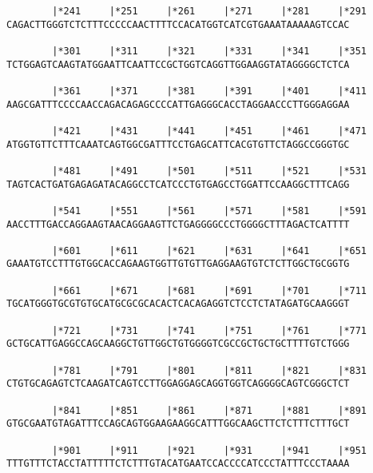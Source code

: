 \documentclass{article}
\begin{document}
\begin{Verbatim}
        |*241     |*251     |*261     |*271     |*281     |*291
CAGACTTGGGTCTCTTTCCCCCAACTTTTCCACATGGTCATCGTGAAATAAAAAGTCCAC
                                                            
        |*301     |*311     |*321     |*331     |*341     |*351
TCTGGAGTCAAGTATGGAATTCAATTCCGCTGGTCAGGTTGGAAGGTATAGGGGCTCTCA
                                                            
        |*361     |*371     |*381     |*391     |*401     |*411
AAGCGATTTCCCCAACCAGACAGAGCCCCATTGAGGGCACCTAGGAACCCTTGGGAGGAA
                                                            
        |*421     |*431     |*441     |*451     |*461     |*471
ATGGTGTTCTTTCAAATCAGTGGCGATTTCCTGAGCATTCACGTGTTCTAGGCCGGGTGC
                                                            
        |*481     |*491     |*501     |*511     |*521     |*531
TAGTCACTGATGAGAGATACAGGCCTCATCCCTGTGAGCCTGGATTCCAAGGCTTTCAGG
                                                            
        |*541     |*551     |*561     |*571     |*581     |*591
AACCTTTGACCAGGAAGTAACAGGAAGTTCTGAGGGGCCCTGGGGCTTTAGACTCATTTT
                                                            
        |*601     |*611     |*621     |*631     |*641     |*651
GAAATGTCCTTTGTGGCACCAGAAGTGGTTGTGTTGAGGAAGTGTCTCTTGGCTGCGGTG
                                                            
        |*661     |*671     |*681     |*691     |*701     |*711
TGCATGGGTGCGTGTGCATGCGCGCACACTCACAGAGGTCTCCTCTATAGATGCAAGGGT
                                                            
        |*721     |*731     |*741     |*751     |*761     |*771
GCTGCATTGAGGCCAGCAAGGCTGTTGGCTGTGGGGTCGCCGCTGCTGCTTTTGTCTGGG
                                                            
        |*781     |*791     |*801     |*811     |*821     |*831
CTGTGCAGAGTCTCAAGATCAGTCCTTGGAGGAGCAGGTGGTCAGGGGCAGTCGGGCTCT
                                                            
        |*841     |*851     |*861     |*871     |*881     |*891
GTGCGAATGTAGATTTCCAGCAGTGGAAGAAGGCATTTGGCAAGCTTCTCTTTCTTTGCT
                                                            
        |*901     |*911     |*921     |*931     |*941     |*951
TTTGTTTCTACCTATTTTTCTCTTTGTACATGAATCCACCCCATCCCTATTTCCCTAAAA
                                                            

\end{Verbatim}
\end{document}
